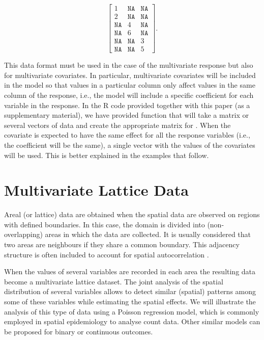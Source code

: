$$
\begin{bmatrix}
1  & \texttt{NA} & \texttt{NA} \\
2  & \texttt{NA} & \texttt{NA} \\
\texttt{NA} & 4  & \texttt{NA} \\
\texttt{NA} & 6  & \texttt{NA} \\
\texttt{NA} & \texttt{NA} & 3 \\
\texttt{NA} & \texttt{NA} & 5 
\end{bmatrix} .
$$


\medskip
This data format must be used in the case of the multivariate response but also for multivariate covariates. In particular, multivariate covariates will be included in the model so that values in a particular column only affect values in the same column of the response, i.e., the model will include a specific coefficient for each variable in the response. In the R code provided together with this paper (as a supplementary material), we have provided function  that will take a matrix or several vectors of data and create the appropriate matrix for . When the covariate is expected to have the same effect for all the response variables (i.e., the coefficient will be the same), a single vector with the values of the covariates will be used. This is better explained in the examples that follow.


\section{Multivariate Lattice Data}
\label{sec:lattice}

\medskip
Areal (or lattice) data are obtained when the spatial data are observed on regions with defined boundaries. In this case, the domain is divided into (non-overlapping) areas in which the data are collected. It is usually considered that two areas are neighbours if they share a common boundary. This adjacency structure is often included to account for spatial autocorrelation \citep{banerjee2014hierarchical}. 

\medskip
When the values of several variables are recorded in each area the resulting data become a multivariate lattice dataset. The joint analysis of the spatial distribution of several variables allows to detect similar (spatial) patterns among some of these variables \citep[][ Chapter 10]{banerjee2014hierarchical} while estimating the spatial effects. We will illustrate the analysis of this type of data using a Poisson regression model, which is commonly employed in spatial epidemiology to analyse count data. Other similar models can be proposed for binary or continuous outcomes.

